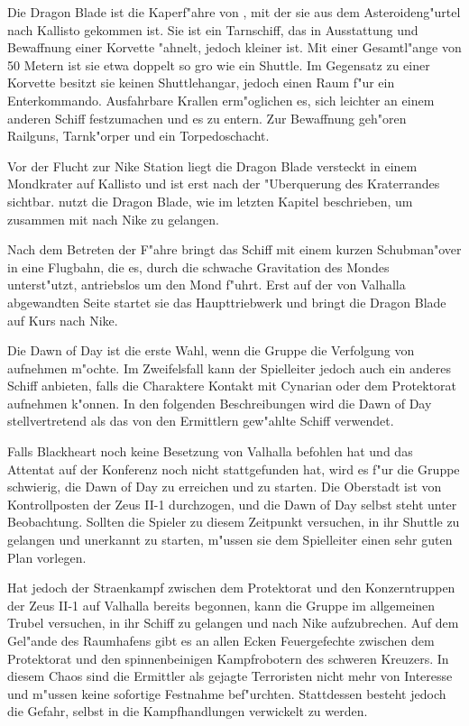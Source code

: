 
Die Dragon Blade ist die Kaperf"ahre von \xl{}, mit der sie aus dem Asteroideng"urtel nach Kallisto gekommen ist. Sie ist ein Tarnschiff, das in Ausstattung und Bewaffnung einer Korvette "ahnelt, jedoch kleiner ist. Mit einer Gesamtl"ange von 50 Metern ist sie etwa doppelt so gro\3 wie ein Shuttle. Im Gegensatz zu einer Korvette besitzt sie keinen Shuttlehangar, jedoch einen Raum f"ur ein Enterkommando. Ausfahrbare Krallen erm"oglichen es, sich leichter an einem anderen Schiff festzumachen und es zu entern. Zur Bewaffnung geh"oren Railguns, Tarnk"orper und ein Torpedoschacht.

Vor der Flucht zur Nike Station liegt die Dragon Blade versteckt in einem Mondkrater auf Kallisto und ist erst nach der "Uberquerung des Kraterrandes sichtbar. \xl{} nutzt die Dragon Blade, wie im letzten Kapitel beschrieben, um zusammen mit \ml{} nach Nike zu gelangen.

Nach dem Betreten der F"ahre bringt \xl{} das Schiff mit einem kurzen Schubman"over in eine Flugbahn, die es, durch die schwache Gravitation des Mondes unterst"utzt, antriebslos um den Mond f"uhrt. Erst auf der von Valhalla abgewandten Seite startet sie das Haupttriebwerk und bringt die Dragon Blade auf Kurs nach Nike.

Die Dawn of Day ist die erste Wahl, wenn die Gruppe die Verfolgung von \xl{} aufnehmen m"ochte. Im Zweifelsfall kann der Spielleiter jedoch auch ein anderes Schiff anbieten, falls die Charaktere Kontakt mit Cynarian oder dem Protektorat aufnehmen k"onnen. In den folgenden Beschreibungen wird die Dawn of Day stellvertretend als das von den Ermittlern gew"ahlte Schiff verwendet.

Falls Blackheart noch keine Besetzung von Valhalla befohlen hat und das Attentat auf der Konferenz noch nicht stattgefunden hat, wird es f"ur die Gruppe schwierig, die Dawn of Day zu erreichen und zu starten. Die Oberstadt ist von Kontrollposten der Zeus II-1 durchzogen, und die Dawn of Day selbst steht unter Beobachtung. Sollten die Spieler zu diesem Zeitpunkt versuchen, in ihr Shuttle zu gelangen und unerkannt zu starten, m"ussen sie dem Spielleiter einen sehr guten Plan vorlegen.

Hat jedoch der Stra\3enkampf zwischen dem Protektorat und den Konzerntruppen der Zeus II-1 auf Valhalla bereits begonnen, kann die Gruppe im allgemeinen Trubel versuchen, in ihr Schiff zu gelangen und nach Nike aufzubrechen. Auf dem Gel"ande des Raumhafens gibt es an allen Ecken Feuergefechte zwischen dem Protektorat und den spinnenbeinigen Kampfrobotern des schweren Kreuzers. In diesem Chaos sind die Ermittler als gejagte Terroristen nicht mehr von Interesse und m"ussen keine sofortige Festnahme bef"urchten. Stattdessen besteht jedoch die Gefahr, selbst in die Kampfhandlungen verwickelt zu werden.

